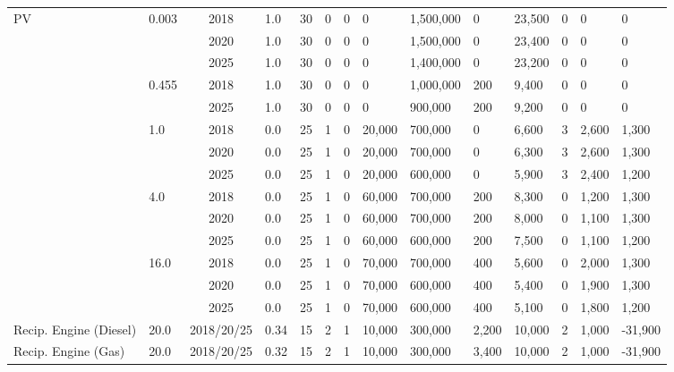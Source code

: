 \begin{table*}[]
\begin{tabularx}{\linewidth}{|p{}|l|c|l|l|l|l|l|l|l|l|l|l|l|}
\multirow{14}{*}{PV} & \multirow{3}{*}{0.003} & 2018 & 1.0 & 30 & 0 & 0 & 0 & 1,500,000 & 0 & 23,500 & 0 & 0 & 0 \\ \cline{3-14} 
&  & 2020 & 1.0 & 30 & 0 & 0 & 0 & 1,500,000 & 0 & 23,400 & 0 & 0 & 0 \\ \cline{3-14} 
&  & 2025 & 1.0 & 30 & 0 & 0 & 0 & 1,400,000 & 0 & 23,200 & 0 & 0 & 0 \\ \cline{2-14} 
& \multirow{2}{*}{0.455} & 2018 & 1.0 & 30 & 0 & 0 & 0 & 1,000,000 & 200 & 9,400 & 0 & 0 & 0 \\ \cline{3-14} 
&  & 2025 & 1.0 & 30 & 0 & 0 & 0 & 900,000 & 200 & 9,200 & 0 & 0 & 0 \\ \cline{2-14} 
& \multirow{3}{*}{1.0} & 2018 & 0.0 & 25 & 1 & 0 & 20,000 & 700,000 & 0 & 6,600 & 3 & 2,600 & 1,300 \\ \cline{3-14} 
&  & 2020 & 0.0 & 25 & 1 & 0 & 20,000 & 700,000 & 0 & 6,300 & 3 & 2,600 & 1,300 \\ \cline{3-14} 
&  & 2025 & 0.0 & 25 & 1 & 0 & 20,000 & 600,000 & 0 & 5,900 & 3 & 2,400 & 1,200 \\ \cline{2-14} 
& \multirow{3}{*}{4.0} & 2018 & 0.0 & 25 & 1 & 0 & 60,000 & 700,000 & 200 & 8,300 & 0 & 1,200 & 1,300 \\ \cline{3-14} 
&  & 2020 & 0.0 & 25 & 1 & 0 & 60,000 & 700,000 & 200 & 8,000 & 0 & 1,100 & 1,300 \\ \cline{3-14} 
&  & 2025 & 0.0 & 25 & 1 & 0 & 60,000 & 600,000 & 200 & 7,500 & 0 & 1,100 & 1,200 \\ \cline{2-14} 
& \multirow{3}{*}{16.0} & 2018 & 0.0 & 25 & 1 & 0 & 70,000 & 700,000 & 400 & 5,600 & 0 & 2,000 & 1,300 \\ \cline{3-14} 
&  & 2020 & 0.0 & 25 & 1 & 0 & 70,000 & 600,000 & 400 & 5,400 & 0 & 1,900 & 1,300 \\ \cline{3-14} 
&  & 2025 & 0.0 & 25 & 1 & 0 & 70,000 & 600,000 & 400 & 5,100 & 0 & 1,800 & 1,200 \\ \hline
Recip. Engine (Diesel) & 20.0 & 2018/20/25 & 0.34 & 15 & 2 & 1 & 10,000 & 300,000 & 2,200 & 10,000 & 2 & 1,000 & -31,900 \\ \hline
Recip. Engine (Gas) & 20.0 & 2018/20/25 & 0.32 & 15 & 2 & 1 & 10,000 & 300,000 & 3,400 & 10,000 & 2 & 1,000 & -31,900 \\ \hline
		\end{tabularx}
		\label{table:modern_plant_costs}
\end{table*}


